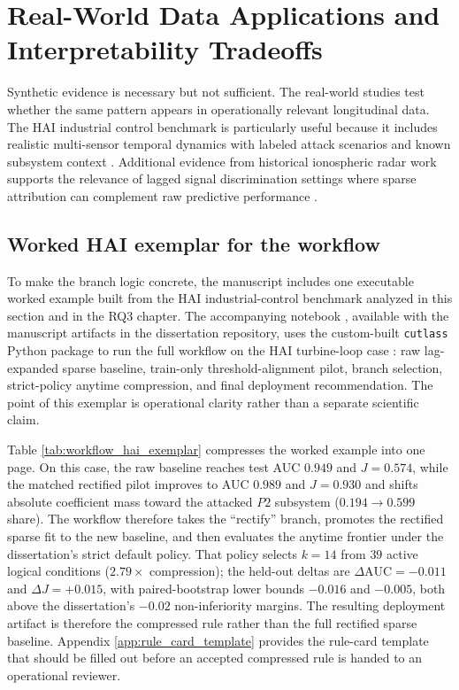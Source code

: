 \section[Real-World Applications]{Real-World Data Applications and Interpretability Tradeoffs}

Synthetic evidence is necessary but not sufficient. The real-world studies test whether the same pattern appears in operationally relevant longitudinal data. The HAI industrial control benchmark is particularly useful because it includes realistic multi-sensor temporal dynamics with labeled attack scenarios and known subsystem context \autocite{shin2020}. Additional evidence from historical ionospheric radar work supports the relevance of lagged signal discrimination settings where sparse attribution can complement raw predictive performance \autocite{sigillito1989}.

\FloatBarrier
\subsection{Worked HAI exemplar for the workflow}

To make the branch logic concrete, the manuscript includes one executable worked example built from the HAI industrial-control benchmark analyzed in this section and in the RQ3 chapter. The accompanying notebook , available with the manuscript artifacts in the dissertation repository, uses the custom-built \texttt{cutlass} Python package to run the full workflow on the HAI turbine-loop case : raw lag-expanded sparse baseline, train-only threshold-alignment pilot, branch selection, strict-policy anytime compression, and final deployment recommendation. The point of this exemplar is operational clarity rather than a separate scientific claim.

Table \ref{tab:workflow_hai_exemplar} compresses the worked example into one page. On this case, the raw baseline reaches test AUC $0.949$ and $J=0.574$, while the matched rectified pilot improves to AUC $0.989$ and $J=0.930$ and shifts absolute coefficient mass toward the attacked $P2$ subsystem ($0.194 \rightarrow 0.599$ share). The workflow therefore takes the ``rectify'' branch, promotes the rectified sparse fit to the new baseline, and then evaluates the anytime frontier under the dissertation's strict default policy. That policy selects $k=14$ from $39$ active logical conditions ($2.79\times$ compression); the held-out deltas are $\Delta \mathrm{AUC}=-0.011$ and $\Delta J=+0.015$, with paired-bootstrap lower bounds $-0.016$ and $-0.005$, both above the dissertation's $-0.02$ non-inferiority margins. The resulting deployment artifact is therefore the compressed rule rather than the full rectified sparse baseline. Appendix \ref{app:rule_card_template} provides the rule-card template that should be filled out before an accepted compressed rule is handed to an operational reviewer.

